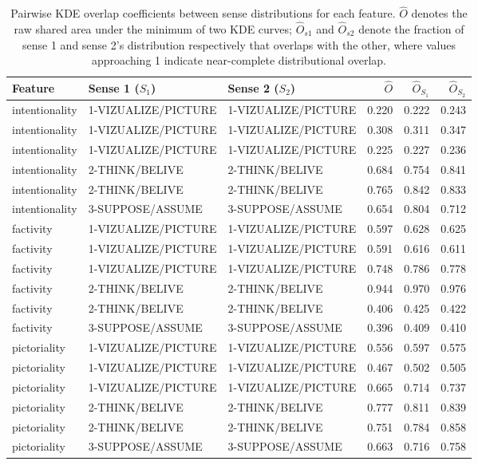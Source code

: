 \documentclass[
]{article}
\begin{document}
\begin{landscape}\begin{table}[H]
\centering
\caption{\label{tab:unnamed-chunk-14}Pairwise KDE overlap coefficients between sense distributions for each feature. 
    $\hat{O}$ denotes the raw shared area under the minimum of two KDE curves; 
    $\hat{O}_{s1}$ and $\hat{O}_{s2}$ denote the fraction of sense 1 and sense 2's 
    distribution respectively that overlaps with the other, where values approaching 1 
    indicate near-complete distributional overlap.\label{tab:overlap}}
\centering
\fontsize{8}{10}\selectfont
\begin{tabular}[t]{lllrrr}
\toprule
Feature & Sense 1 ($S_1$) & Sense 2 ($S_2$) & $\hat{O}$ & $\hat{O}_{S_1}$ & $\hat{O}_{S_2}$\\
\midrule
intentionality & 1-VIZUALIZE/PICTURE & 1-VIZUALIZE/PICTURE & 0.220 & 0.222 & 0.243\\
intentionality & 1-VIZUALIZE/PICTURE & 1-VIZUALIZE/PICTURE & 0.308 & 0.311 & 0.347\\
intentionality & 1-VIZUALIZE/PICTURE & 1-VIZUALIZE/PICTURE & 0.225 & 0.227 & 0.236\\
intentionality & 2-THINK/BELIVE & 2-THINK/BELIVE & 0.684 & 0.754 & 0.841\\
intentionality & 2-THINK/BELIVE & 2-THINK/BELIVE & 0.765 & 0.842 & 0.833\\
intentionality & 3-SUPPOSE/ASSUME & 3-SUPPOSE/ASSUME & 0.654 & 0.804 & 0.712\\
factivity & 1-VIZUALIZE/PICTURE & 1-VIZUALIZE/PICTURE & 0.597 & 0.628 & 0.625\\
factivity & 1-VIZUALIZE/PICTURE & 1-VIZUALIZE/PICTURE & 0.591 & 0.616 & 0.611\\
factivity & 1-VIZUALIZE/PICTURE & 1-VIZUALIZE/PICTURE & 0.748 & 0.786 & 0.778\\
factivity & 2-THINK/BELIVE & 2-THINK/BELIVE & 0.944 & 0.970 & 0.976\\
factivity & 2-THINK/BELIVE & 2-THINK/BELIVE & 0.406 & 0.425 & 0.422\\
factivity & 3-SUPPOSE/ASSUME & 3-SUPPOSE/ASSUME & 0.396 & 0.409 & 0.410\\
pictoriality & 1-VIZUALIZE/PICTURE & 1-VIZUALIZE/PICTURE & 0.556 & 0.597 & 0.575\\
pictoriality & 1-VIZUALIZE/PICTURE & 1-VIZUALIZE/PICTURE & 0.467 & 0.502 & 0.505\\
pictoriality & 1-VIZUALIZE/PICTURE & 1-VIZUALIZE/PICTURE & 0.665 & 0.714 & 0.737\\
pictoriality & 2-THINK/BELIVE & 2-THINK/BELIVE & 0.777 & 0.811 & 0.839\\
pictoriality & 2-THINK/BELIVE & 2-THINK/BELIVE & 0.751 & 0.784 & 0.858\\
pictoriality & 3-SUPPOSE/ASSUME & 3-SUPPOSE/ASSUME & 0.663 & 0.716 & 0.758\\
\bottomrule
\end{tabular}
\end{table}
\end{landscape}
\end{document}
